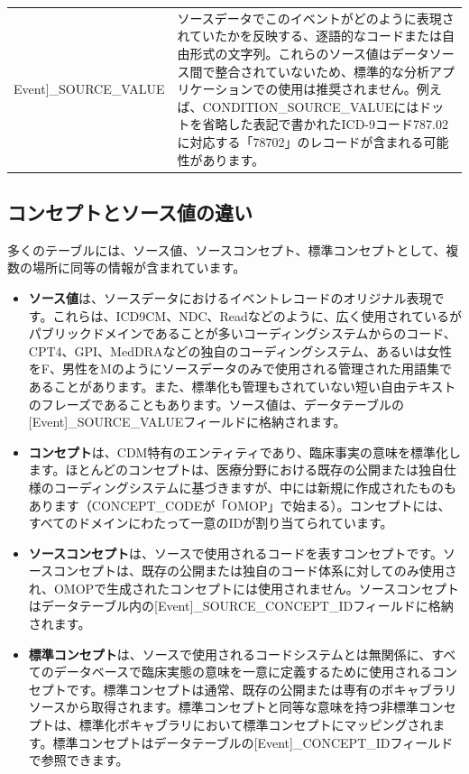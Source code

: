 \documentclass[
  11pt]{book}
\providecommand{\tightlist}{%
  \setlength{\itemsep}{0pt}\setlength{\parskip}{0pt}}
\theoremstyle{definition}
\theoremstyle{definition}
\theoremstyle{definition}
\theoremstyle{definition}
\theoremstyle{remark}
\begin{document}
\begin{longtable}[]{@{}
  >{\raggedright\arraybackslash}p{}
  >{\raggedright\arraybackslash}p{}@{}}
{[}Event{]}\_SOURCE\_VALUE & ソースデータでこのイベントがどのように表現されていたかを反映する、逐語的なコードまたは自由形式の文字列。これらのソース値はデータソース間で整合されていないため、標準的な分析アプリケーションでの使用は推奨されません。例えば、CONDITION\_SOURCE\_VALUEにはドットを省略した表記で書かれたICD-9コード787.02に対応する「78702」のレコードが含まれる可能性があります。 \\
\end{longtable}

\subsection{コンセプトとソース値の違い}\label{concepts-Sources}

多くのテーブルには、ソース値、ソースコンセプト、標準コンセプトとして、複数の場所に同等の情報が含まれています。

\begin{itemize}
\tightlist
\item
  \textbf{ソース値}は、ソースデータにおけるイベントレコードのオリジナル表現です。これらは、ICD9CM、NDC、Readなどのように、広く使用されているがパブリックドメインであることが多いコーディングシステムからのコード、CPT4、GPI、MedDRAなどの独自のコーディングシステム、あるいは女性をF、男性をMのようにソースデータのみで使用される管理された用語集であることがあります。また、標準化も管理もされていない短い自由テキストのフレーズであることもあります。ソース値は、データテーブルの{[}Event{]}\_SOURCE\_VALUEフィールドに格納されます。
\item
  \textbf{コンセプト}は、CDM特有のエンティティであり、臨床事実の意味を標準化します。ほとんどのコンセプトは、医療分野における既存の公開または独自仕様のコーディングシステムに基づきますが、中には新規に作成されたものもあります（CONCEPT\_CODEが「OMOP」で始まる）。コンセプトには、すべてのドメインにわたって一意のIDが割り当てられています。
\item
  \textbf{ソースコンセプト}は、ソースで使用されるコードを表すコンセプトです。ソースコンセプトは、既存の公開または独自のコード体系に対してのみ使用され、OMOPで生成されたコンセプトには使用されません。ソースコンセプトはデータテーブル内の{[}Event{]}\_SOURCE\_CONCEPT\_IDフィールドに格納されます。
\item
  \textbf{標準コンセプト}は、ソースで使用されるコードシステムとは無関係に、すべてのデータベースで臨床実態の意味を一意に定義するために使用されるコンセプトです。標準コンセプトは通常、既存の公開または専有のボキャブラリソースから取得されます。標準コンセプトと同等な意味を持つ非標準コンセプトは、標準化ボキャブラリにおいて標準コンセプトにマッピングされます。標準コンセプトはデータテーブルの{[}Event{]}\_CONCEPT\_IDフィールドで参照できます。
\end{itemize}
\end{document}
